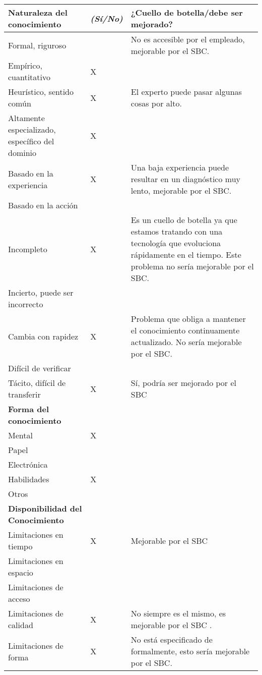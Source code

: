 \documentclass[12pt,a4paper,twoside,spanish]{article}      %
\newcommand{\PreserveBackslash}[1]{\let\temp=\\#1\let\\=\temp}
\let\PBS=\PreserveBackslash
\begin{document}
\begin{table}[H]
\begin{tabularx}{\textwidth}{|p{5cm}|>{\PBS\raggedright}p{0.8cm}|X|}
\textbf{Naturaleza del conocimiento} & \emph{(Sí/No)} &
\textbf{¿Cuello de botella/debe ser mejorado?}
\\ \hline Formal, riguroso & & No es accesible por el empleado, mejorable por el SBC. 
\\ \hline Empírico, cuantitativo & X &
\\ \hline Heurístico, sentido común & X & El experto puede pasar algunas cosas por alto. 
\\ \hline Altamente especializado, específico del dominio & X & 
\\ \hline Basado en la experiencia & X & Una baja experiencia puede resultar en un diagnóstico muy lento, mejorable por el SBC. 
\\ \hline Basado en la acción &  & 
\\ \hline Incompleto & X & Es un cuello de botella ya que estamos tratando con una tecnología que evoluciona rápidamente en el tiempo. Este problema no sería mejorable por el SBC.
\\ \hline Incierto, puede ser incorrecto & & 
\\ \hline Cambia con rapidez & X & Problema que obliga a mantener el conocimiento continuamente actualizado. No sería mejorable por el SBC.
\\ \hline Difícil de verificar &  &  
\\ \hline Tácito, difícil de transferir & X & Sí, podría ser mejorado por el SBC 
\\ \hline \textbf{Forma del conocimiento} & &
\\ \hline Mental& X & 
\\ \hline Papel &  & 
\\ \hline Electrónica &  & 
\\ \hline Habilidades & X &
\\ \hline Otros& & 
\\ \hline \textbf{Disponibilidad del Conocimiento} &  &
\\ \hline Limitaciones en tiempo & X & Mejorable por el SBC 
\\ \hline Limitaciones en espacio & & 
\\ \hline Limitaciones de acceso & &
\\ \hline Limitaciones de calidad & X & No siempre es el mismo, es mejorable por el SBC .
\\ \hline Limitaciones de forma & X & No está especificado de formalmente, esto sería mejorable por el SBC.
\\ \hline
\end{tabularx}
  \label{tab.TM2}
\end{table}
\end{document}
